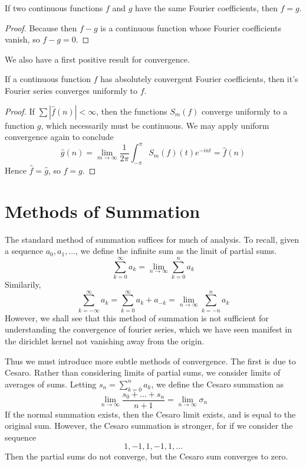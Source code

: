 \begin{corollary}
    If two continuous functions $f$ and $g$ have the same Fourier coefficients, then $f = g$.
\end{corollary}
\begin{proof}
    Because then $f - g$ is a continuous function whose Fourier coefficients vanish, so $f - g = 0$.
\end{proof}

We also have a first positive result for convergence.

\begin{corollary}
    If a continuous function $f$ has absolutely convergent Fourier coefficients, then it's Fourier series converges uniformly to $f$.
\end{corollary}
\begin{proof}
    If $\sum |\hat{f}(n)| < \infty$, then the functions $S_m(f)$ converge uniformly to a function $g$, which necessarily must be continuous. We may apply uniform convergence again to conclude
    \[ \hat{g}(n) = \lim_{m \to \infty} \frac{1}{2\pi} \int_{-\pi}^\pi S_m(f)(t) e^{-int} = \hat{f}(n) \]
    Hence $\hat{f} = \hat{g}$, so $f = g$.
\end{proof}

\section{Methods of Summation}

The standard method of summation suffices for much of analysis. To recall, given a sequence $a_0, a_1, \dots$, we define the infinite sum as the limit of partial sums.
%
\[ \sum_{k = 0}^\infty a_k = \lim_{n \to \infty} \sum_{k = 0}^n a_k \]
%
Similarily,
%
\[ \sum_{k = -\infty}^\infty a_k = \sum_{k = 0}^\infty a_k + a_{-k} = \lim_{n \to \infty} \sum_{k = -n}^n a_k \]
%
However, we shall see that this method of summation is not sufficient for understanding the convergence of fourier series, which we have seen manifest in the dirichlet kernel not vanishing away from the origin.

Thus we must introduce more subtle methods of convergence. The first is due to Cesaro. Rather than considering limits of partial sums, we consider limits of averages of sums. Letting $s_n = \sum_{k = 0}^n a_k$, we define the Cesaro summation as
%
\[ \lim_{n \to \infty} \frac{s_0 + \dots + s_n}{n+1} = \lim_{n \to \infty} \sigma_n \]
%
If the normal summation exists, then the Cesaro limit exists, and is equal to the original sum. However, the Cesaro summation is stronger, for if we consider the sequence
%
\[ 1,-1,1,-1,1,\dots \]
%
Then the partial sums do not converge, but the Cesaro sum converges to zero.

